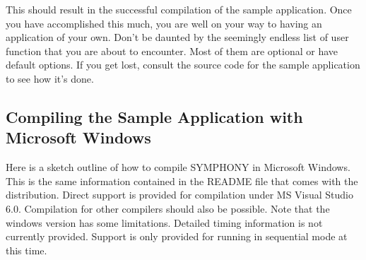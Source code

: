 \noindent This should result in the successful compilation of the sample
application. Once you have accomplished this much, you are well on
your way to having an application of your own. Don't be daunted by the
seemingly endless list of user function that you are about to
encounter. Most of them are optional or have default options. If you
get lost, consult the source code for the sample application to see
how it's done.

\subsection{Compiling the Sample Application with Microsoft Windows}
\label{getting_started_windows}

Here is a sketch outline of how to compile SYMPHONY in Microsoft Windows. This
is the same information contained in the README file that comes with the
distribution. Direct support is provided for compilation under MS Visual
Studio 6.0. Compilation for other compilers should also be possible. Note that
the windows version has some limitations. Detailed timing information is not
currently provided.  Support is only provided for running in sequential mode
at this time.

